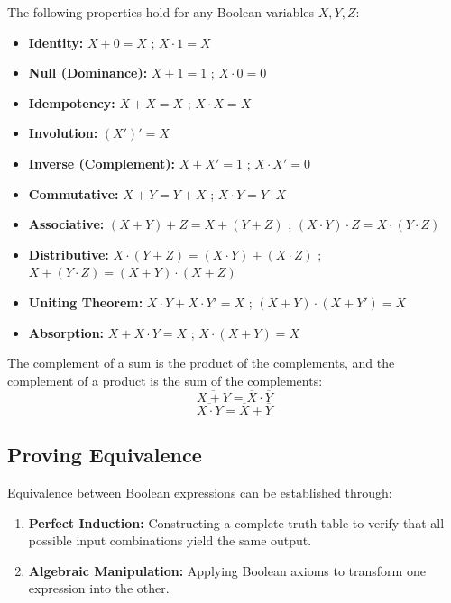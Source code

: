 \begin{theorem}
The following properties hold for any Boolean variables $X, Y, Z$:

\begin{itemize}
    \item \textbf{Identity:} $X + 0 = X$ ; $X \cdot 1 = X$
    \item \textbf{Null (Dominance):} $X + 1 = 1$ ; $X \cdot 0 = 0$
    \item \textbf{Idempotency:} $X + X = X$ ; $X \cdot X = X$
    \item \textbf{Involution:} $(X')' = X$
    \item \textbf{Inverse (Complement):} $X + X' = 1$ ; $X \cdot X' = 0$
    \item \textbf{Commutative:} $X + Y = Y + X$ ; $X \cdot Y = Y \cdot X$
    \item \textbf{Associative:} $(X + Y) + Z = X + (Y + Z)$ ; $(X \cdot Y) \cdot Z = X \cdot (Y \cdot Z)$
    \item \textbf{Distributive:} $X \cdot (Y + Z) = (X \cdot Y) + (X \cdot Z)$ ; $X + (Y \cdot Z) = (X + Y) \cdot (X + Z)$
    \item \textbf{Uniting Theorem:} $X \cdot Y + X \cdot Y' = X$ ; $(X + Y) \cdot (X + Y') = X$
    \item \textbf{Absorption:} $X + X \cdot Y = X$ ; $X \cdot (X + Y) = X$
\end{itemize}

\end{theorem}

\begin{proposition}
The complement of a sum is the product of the complements, and the complement of a product is the sum of the complements:
\begin{equation}
\overline{X + Y} = \overline{X} \cdot \overline{Y}
\end{equation}
\begin{equation}
\overline{X \cdot Y} = \overline{X} + \overline{Y}
\end{equation}
\end{proposition}

\subsection{Proving Equivalence}

Equivalence between Boolean expressions can be established through:

\begin{enumerate}
    \item \textbf{Perfect Induction:} Constructing a complete truth table to verify that all possible input combinations yield the same output.
    \item \textbf{Algebraic Manipulation:} Applying Boolean axioms to transform one expression into the other.
\end{enumerate}

